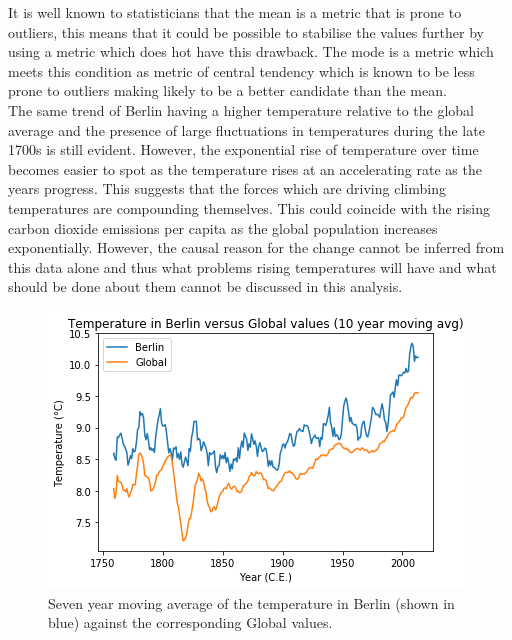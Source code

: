 \documentclass[journal, a4paper]{IEEEtran}
\begin{document}
    It is well known to statisticians that the mean is a metric that is prone to outliers, this means that it could be possible to stabilise the values further by using a metric which does hot have this drawback. The mode is a metric which meets this condition as metric of central tendency which is known to be less prone to outliers making likely to be a better candidate than the mean.\\

    The same trend of Berlin having a higher temperature relative to the global average and the presence of large fluctuations in temperatures during the late 1700s is still evident. However, the exponential rise of temperature over time becomes easier to spot as the temperature rises at an accelerating rate as the years progress. This suggests that the forces which are driving climbing temperatures are compounding themselves. This could coincide with the rising carbon dioxide emissions per capita as the global population increases exponentially. However, the causal reason for the change cannot be inferred from this data alone and thus what problems rising temperatures will have and what should be done about them cannot be discussed in this analysis.\\

	\begin{figure}[tbh]
		\begin{center}
		\includegraphics[width=\columnwidth]{Plots/MovingAverageTemperaturePlot_010years.png}
		\caption{Seven year moving average of the temperature in Berlin (shown in blue) against the corresponding Global values.}
		\label{fig2}
		\end{center}
	\end{figure}
\end{document}
